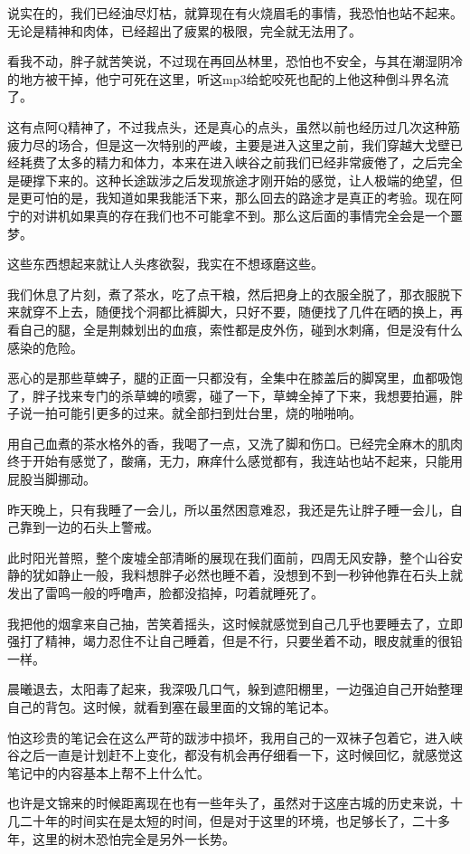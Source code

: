 说实在的，我们已经油尽灯枯，就算现在有火烧眉毛的事情，我恐怕也站不起来。无论是精神和肉体，已经超出了疲累的极限，完全就无法用了。

看我不动，胖子就苦笑说，不过现在再回丛林里，恐怕也不安全，与其在潮湿阴冷的地方被干掉，他宁可死在这里，听这mp3给蛇咬死也配的上他这种倒斗界名流了。

这有点阿Q精神了，不过我点头，还是真心的点头，虽然以前也经历过几次这种筋疲力尽的场合，但是这一次特别的严峻，主要是进入这里之前，我们穿越大戈壁已经耗费了太多的精力和体力，本来在进入峡谷之前我们已经非常疲倦了，之后完全是硬撑下来的。这种长途跋涉之后发现旅途才刚开始的感觉，让人极端的绝望，但是更可怕的是，我知道如果我能活下来，那么回去的路途才是真正的考验。现在阿宁的对讲机如果真的存在我们也不可能拿不到。那么这后面的事情完全会是一个噩梦。

这些东西想起来就让人头疼欲裂，我实在不想琢磨这些。

我们休息了片刻，煮了茶水，吃了点干粮，然后把身上的衣服全脱了，那衣服脱下来就穿不上去，随便找个洞都比裤脚大，只好不要，随便找了几件在晒的换上，再看自己的腿，全是荆棘划出的血痕，索性都是皮外伤，碰到水刺痛，但是没有什么感染的危险。

恶心的是那些草蜱子，腿的正面一只都没有，全集中在膝盖后的脚窝里，血都吸饱了，胖子找来专门的杀草蜱的喷雾，碰了一下，草蜱全掉了下来，我想要拍遍，胖子说一拍可能引更多的过来。就全部扫到灶台里，烧的啪啪响。

用自己血煮的茶水格外的香，我喝了一点，又洗了脚和伤口。已经完全麻木的肌肉终于开始有感觉了，酸痛，无力，麻痒什么感觉都有，我连站也站不起来，只能用屁股当脚挪动。

昨天晚上，只有我睡了一会儿，所以虽然困意难忍，我还是先让胖子睡一会儿，自己靠到一边的石头上警戒。

此时阳光普照，整个废墟全部清晰的展现在我们面前，四周无风安静，整个山谷安静的犹如静止一般，我料想胖子必然也睡不着，没想到不到一秒钟他靠在石头上就发出了雷鸣一般的呼噜声，脸都没掐掉，叼着就睡死了。

我把他的烟拿来自己抽，苦笑着摇头，这时候就感觉到自己几乎也要睡去了，立即强打了精神，竭力忍住不让自己睡着，但是不行，只要坐着不动，眼皮就重的很铅一样。

晨曦退去，太阳毒了起来，我深吸几口气，躲到遮阳棚里，一边强迫自己开始整理自己的背包。这时候，就看到塞在最里面的文锦的笔记本。

怕这珍贵的笔记会在这么严苛的跋涉中损坏，我用自己的一双袜子包着它，进入峡谷之后一直是计划赶不上变化，都没有机会再仔细看一下，这时候回忆，就感觉这笔记中的内容基本上帮不上什么忙。

也许是文锦来的时候距离现在也有一些年头了，虽然对于这座古城的历史来说，十几二十年的时间实在是太短的时间，但是对于这里的环境，也足够长了，二十多年，这里的树木恐怕完全是另外一长势。

